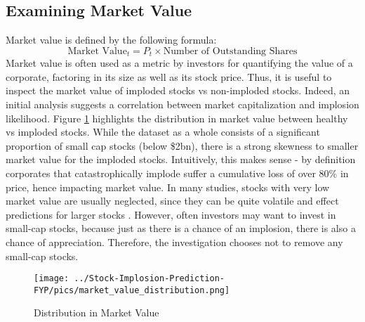 \documentclass[a4paper]{report}
\begin{document}
\subsection{Examining Market Value}
Market value is defined by the following formula:
\begin{equation}
  \text{Market Value}_t = P_t \times \text{Number of Outstanding Shares}
\end{equation}
Market value is often used as a metric by investors for quantifying the value of a corporate, factoring in its size as well as its stock price. Thus, it is useful to inspect the market value of imploded stocks vs non-imploded stocks. Indeed, an initial analysis suggests a correlation between market capitalization and implosion likelihood. 
Figure \ref{fig:MV_Dist} highlights the distribution in market value between healthy vs imploded stocks. While 
the dataset as a whole consists of a significant proportion of small cap stocks (below \$2bn), there is a strong skewness to smaller market value for the imploded stocks. Intuitively, this makes sense - by definition corporates that catastrophically implode suffer a cumulative loss 
of over 80\% in price, hence impacting market value. In many studies, stocks with very low market value are usually neglected, since they can be quite volatile and effect predictions for larger stocks \citep{mckibben2017predicting}. However, often investors 
may want to invest in small-cap stocks, because just as there is a chance of an implosion, there is also a chance of appreciation. Therefore, the investigation chooses not to remove any small-cap stocks.
\begin{figure}[htbp] %
  \centering %
  \texttt{[image: ../Stock-Implosion-Prediction-FYP/pics/market\_value\_distribution.png]} %
  \caption{Distribution in Market Value} %
  \label{fig:MV_Dist} %
\end{figure}
\end{document}
